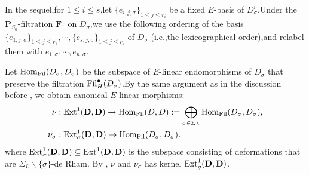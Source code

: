 \documentclass[10pt]{article}
\newcommand{\fil}{{\rm Fil}}
\newcommand{\homo}{{\rm Hom}}
\newcommand{\ext}{{\rm Ext}}
\newcommand{\Dpik}{{\mathbf{D}}}
\newcommand{\bF}{{\mathbf{F}}}
\newcommand{\bP}{{\mathbf{P}}}
\begin{document}
In the sequel,\;for $1\leq i\leq s$,\;let $\{e_{i,j,\sigma}\}_{1\leq j\leq r_i}$ be a fixed $E$-basis of $D^i_{\sigma}$.\;Under the $\bP_{S_0}$-filtration $\bF_1$ on $D_{\sigma}$,\;we use the following ordering of the basis $\{e_{1,j,\sigma}\}_{1\leq j\leq r_1},\cdots,\{e_{s,j,\sigma}\}_{1\leq j\leq r_s}$ of $D_{\sigma}$ (i.e.,\;the lexicographical order),\;and relabel  them with $e_{1,\sigma},\cdots,e_{n,\sigma}$.\;



Let $\homo_{\fil}(D_{\sigma},D_{\sigma})$ be the subspace of $E$-linear endomorphisms of $D_{\sigma}$ that preserve the filtration $\fil_{H}^{\bullet}(D_{\sigma})$.\;By the same argument as in the discussion before \cite[(112)]{BDcritical25}, we obtain canonical $E$-linear morphisms:
\begin{equation}\label{maptofilDsigma}
	\begin{aligned}
		\nu:	&\;\ext^{1}(\Dpik,\Dpik)\rightarrow \homo_{\fil}(D,D):=\bigoplus_{\sigma\in\Sigma_L}\homo_{\fil}(D_{\sigma},D_{\sigma}),\\
		\nu_{\sigma}:	&\;\ext^{1}_{\sigma}(\Dpik,\Dpik)\rightarrow \homo_{\fil}(D_{\sigma},D_{\sigma}).\;
	\end{aligned}
\end{equation}
where $\ext^{1}_{\sigma}(\Dpik,\Dpik)\subseteq \ext^{1}(\Dpik,\Dpik)$ is the subspace consisting of deformations that are $\Sigma_L\backslash \{\sigma\}$-de Rham.\;
By \cite[Lemma 2.4.1]{BDcritical25}, $\nu$ and $\nu_{\sigma}$ has kernel $\ext^{1}_g(\Dpik,\Dpik)$.\;
\end{document}

